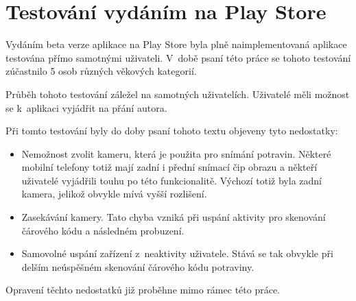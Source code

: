 \documentclass[thesis=B,czech]{FITthesis}[2013/10/20]
\begin{document}
\section{Testování vydáním na Play Store}

Vydáním beta verze aplikace na Play Store byla plně naimplementovaná aplikace testována přímo samotnými uživateli. V~době psaní této práce se tohoto testování zúčastnilo 5 osob různých věkových kategorií.

Průběh tohoto testování záležel na samotných uživatelích. Uživatelé měli možnost se k~aplikaci vyjádřit na přání autora.

Při tomto testování byly do doby psaní tohoto textu objeveny tyto nedostatky:

\begin{itemize}
	\item{Nemožnost zvolit kameru, která je použita pro snímání potravin. Některé mobilní telefony totiž mají zadní i přední snímací čip obrazu a někteří uživatelé vyjádřili touhu po této funkcionalitě. Výchozí totiž byla zadní kamera, jelikož obvykle mívá vyšší rozlišení.}
	\item{Zasekávání kamery. Tato chyba vzniká při uspání aktivity pro skenování čárového kódu a následném probuzení.}
	\item{Samovolné uspání zařízení z~neaktivity uživatele. Stává se tak obvykle při delším neúspěšném skenování čárového kódu potraviny.}
\end{itemize}

Opravení těchto nedostatků již proběhne mimo rámec této práce.
\end{document}
